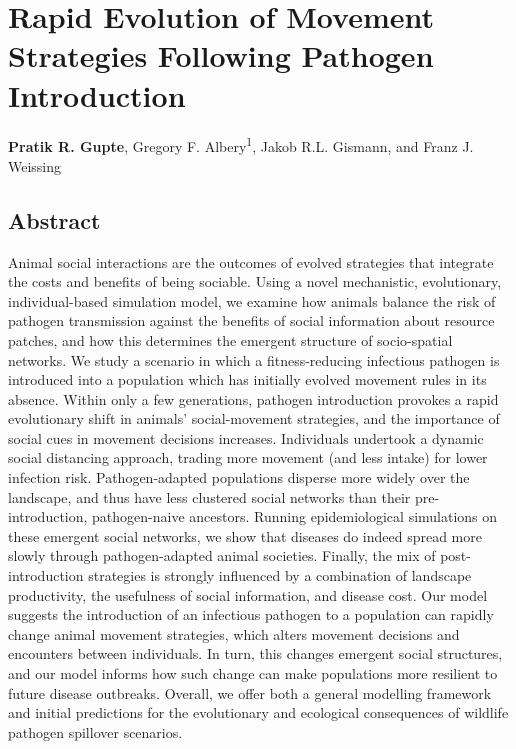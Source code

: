 \chapter{Rapid Evolution of Movement Strategies Following Pathogen Introduction}\label{ch:pathomove}

{\noindent \sffamily\textbf{Pratik R. Gupte}, Gregory F. Albery\textsuperscript{1}, Jakob R.L. Gismann, and Franz J. Weissing}


\section*{Abstract}

\small{
    Animal social interactions are the outcomes of evolved strategies that integrate the costs and benefits of being sociable.
    Using a novel mechanistic, evolutionary, individual-based simulation model, we examine how animals balance the risk of pathogen transmission against the benefits of social information about resource patches, and how this determines the emergent structure of socio-spatial networks.
    We study a scenario in which a fitness-reducing infectious pathogen is introduced into a population which has initially evolved movement rules in its absence.
    Within only a few generations, pathogen introduction provokes a rapid evolutionary shift in animals' social-movement strategies, and the importance of social cues in movement decisions increases.
    Individuals undertook a dynamic social distancing approach, trading more movement (and less intake) for lower infection risk.
    Pathogen-adapted populations disperse more widely over the landscape, and thus have less clustered social networks than their pre-introduction, pathogen-naive ancestors.
    Running epidemiological simulations on these emergent social networks, we show that diseases do indeed spread more slowly through pathogen-adapted animal societies.
    Finally, the mix of post-introduction strategies is strongly influenced by a combination of landscape productivity, the usefulness of social information, and disease cost.
    Our model suggests the introduction of an infectious pathogen to a population can rapidly change animal movement strategies, which alters movement decisions and encounters between individuals. 
    In turn, this changes emergent social structures, and our model informs how such change can make populations more resilient to future disease outbreaks.
    Overall, we offer both a general modelling framework and initial predictions for the evolutionary and ecological consequences of wildlife pathogen spillover scenarios.

    \medskip

}

\clearpage